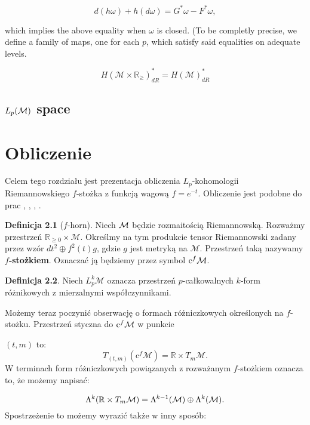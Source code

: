 \documentclass[licencjacka]{pracamgr}
\theoremstyle{definition}
\newtheorem{definition}{Definicja}[section]
\theoremstyle{definition}
\theoremstyle{plain}
\theoremstyle{plain}
\def\cfm{\ensuremath\mathrm{c}^f\mathcal{M}}
\def\M{\ensuremath\mathcal{M}}
\begin{document}
\[
    d(h\omega) + h(d\omega) = G^\ast \omega - F^\ast \omega ,
\]

which implies the above equality when $\omega$ is closed. (To be
completly precise, we define a family of maps, one for each $p$, which
satisfy said equalities on adequate levels.

\[
    H(\mathcal{M} \times \mathbb{R}_{\geq})_{dR}^\ast = H(\mathcal{M})_{dR}^\ast
\]

\section{$L_p(\M)$ space}



\chapter{Obliczenie}

Celem tego rozdziału jest prezentacja obliczenia 
$L_p$-kohomologii Riemannowskiego $f$-stożka z funkcją wagową $f = e^{-t}$.
Obliczenie jest podobne do prac \cite{cheeger}, \cite{youssin}, \cite{kirwan},
\cite{weber}.

\begin{definition}[$f$-horn]
    Niech $\M$ będzie rozmaitością Riemannowską. Rozważmy przestrzeń
    $\mathbb{R}_{\geq 0} \times \mathcal{M}$. Określmy na tym produkcie tensor
    Riemannowski zadany przez wzór $dt^2 \oplus f^{2}(t)g $, gdzie $g$ jest
    metryką na $\mathcal{M}$.  Przestrzeń taką nazywamy \textbf{$f$-stożkiem}.
    Oznaczać ją będziemy przez symbol $\cfm$.
\end{definition}

\begin{definition}
  Niech $L_p^k \mathcal{M}$ oznacza przestrzeń $p$-całkowalnych 
  $k$-form różnikowych z mierzalnymi  współczynnikami.
\end{definition}



Możemy teraz poczynić obserwację o formach różniczkowych określonych na 
$f$-stożku. Przestrzeń styczna do $\cfm$ w punkcie 

$(t, m)$ to:
\[
    T_{(t, m)} (\mathrm{c}^f \mathcal{M}) = \mathbb{R} \times T_m \mathcal{M}.
\]
W terminach form różniczkowych powiązanych z rozważanym $f$-stożkiem oznacza to, 
że możemy napisać:

\[
\Lambda^k(\mathbb{R} \times T_m \M) = 
\Lambda^{k-1}(\M)  \oplus \Lambda^k(\M).
\]
Spostrzeżenie to możemy wyrazić także w inny sposób: 
\end{document}
